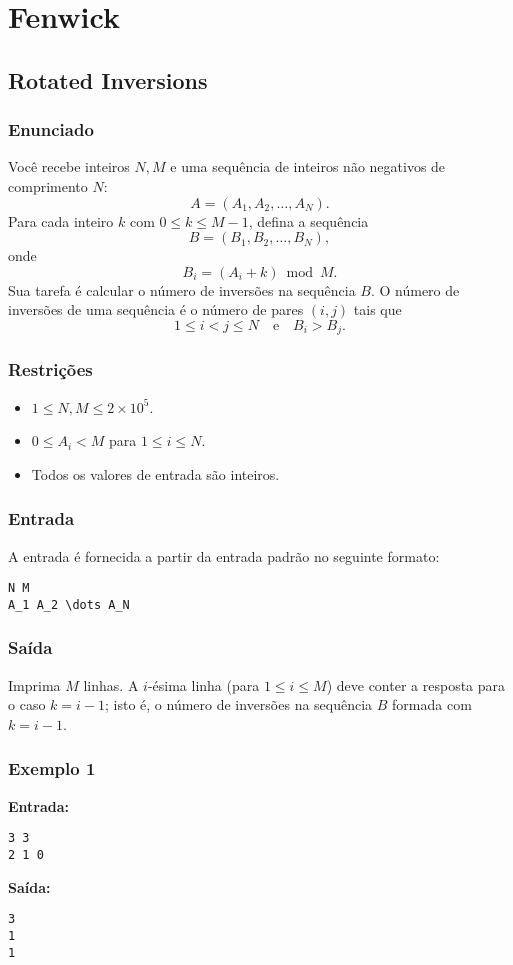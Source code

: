 \section{Fenwick}
\subsection{Rotated Inversions}

\subsubsection*{Enunciado}
Você recebe inteiros \(N, M\) e uma sequência de inteiros não negativos de comprimento \(N\):
\[
A = (A_1, A_2, \ldots, A_N).
\]
Para cada inteiro \(k\) com \(0 \le k \le M-1\), defina a sequência
\[
B = (B_1, B_2, \ldots, B_N),
\]
onde
\[
B_i = (A_i + k) \bmod M.
\]
Sua tarefa é calcular o número de inversões na sequência \(B\). O número de inversões de uma sequência é o número de pares \((i,j)\) tais que
\[
1 \le i < j \le N \quad \text{e} \quad B_i > B_j.
\]

\subsubsection*{Restrições}
\begin{itemize}
    \item \(1 \le N, M \le 2 \times 10^5\).
    \item \(0 \le A_i < M\) para \(1 \le i \le N\).
    \item Todos os valores de entrada são inteiros.
\end{itemize}

\subsubsection*{Entrada}
A entrada é fornecida a partir da entrada padrão no seguinte formato:
\begin{verbatim}
N M
A_1 A_2 \dots A_N
\end{verbatim}

\subsubsection*{Saída}
Imprima \(M\) linhas. A \(i\)-ésima linha (para \(1 \le i \le M\)) deve conter a resposta para o caso \(k = i-1\); isto é, o número de inversões na sequência \(B\) formada com \(k = i-1\).

\subsubsection*{Exemplo 1}
\textbf{Entrada:}
\begin{verbatim}
3 3
2 1 0
\end{verbatim}
\textbf{Saída:}
\begin{verbatim}
3
1
1
\end{verbatim}

